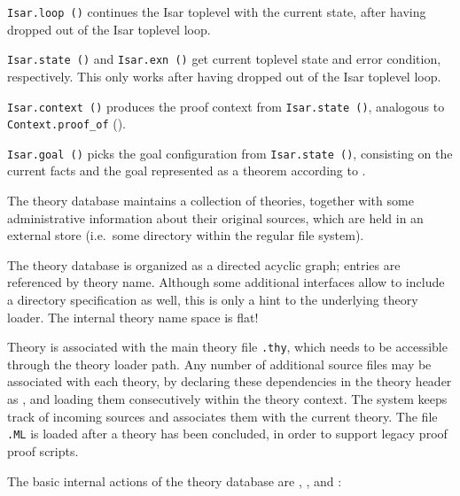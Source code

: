 \begin{isabellebody}
\begin{isamarkuptext}
\begin{description}
  \item \verb|Isar.loop ()| continues the Isar toplevel with the
  current state, after having dropped out of the Isar toplevel loop.

  \item \verb|Isar.state ()| and \verb|Isar.exn ()| get current
  toplevel state and error condition, respectively.  This only works
  after having dropped out of the Isar toplevel loop.

  \item \verb|Isar.context ()| produces the proof context from \verb|Isar.state ()|, analogous to \verb|Context.proof_of|
  ().

  \item \verb|Isar.goal ()| picks the goal configuration from \verb|Isar.state ()|, consisting on the current facts and the goal
  represented as a theorem according to .

  \end{description}%
\end{isamarkuptext}%
\isamarkuptrue%
%
\endisatagmlref
{\isafoldmlref}%
%
\isadelimmlref
%
\endisadelimmlref
%
\isamarkuptrue%
%
\begin{isamarkuptext}%
The theory database maintains a collection of theories, together
  with some administrative information about their original sources,
  which are held in an external store (i.e.\ some directory within the
  regular file system).

  The theory database is organized as a directed acyclic graph;
  entries are referenced by theory name.  Although some additional
  interfaces allow to include a directory specification as well, this
  is only a hint to the underlying theory loader.  The internal theory
  name space is flat!

  Theory  is associated with the main theory file \verb,.thy,, which needs to be accessible through the theory
  loader path.  Any number of additional {\ML} source files may be
  associated with each theory, by declaring these dependencies in the
  theory header as \isa{{\isasymUSES}}, and loading them consecutively
  within the theory context.  The system keeps track of incoming {\ML}
  sources and associates them with the current theory.  The file
  \verb,.ML, is loaded after a theory has been concluded, in
  order to support legacy proof {\ML} proof scripts.

  The basic internal actions of the theory database are , , and :


\end{isamarkuptext}
\end{isabellebody}
